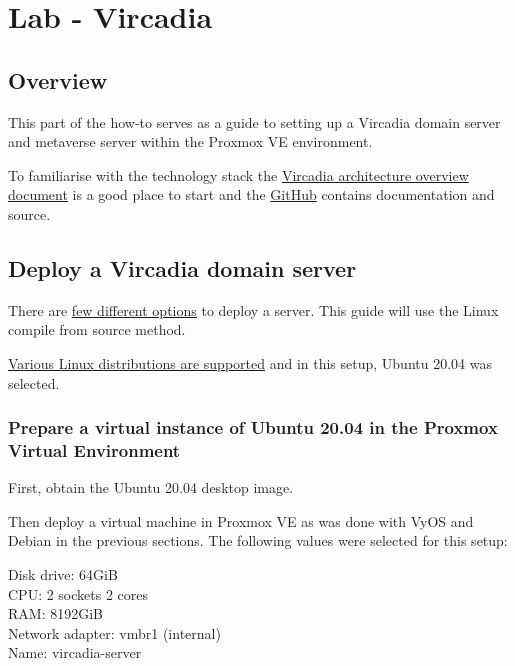 \hypertarget{lab---vircadia}{%
\section{Lab - Vircadia}\label{lab---vircadia}}

\hypertarget{overview}{%
\subsection{Overview}\label{overview}}

This part of the how-to serves as a guide to setting up a Vircadia
domain server and metaverse server within the Proxmox VE environment.

To familiarise with the technology stack the
\href{https://docs.vircadia.com/explore/get-started/architecture.html}{Vircadia
architecture overview document} is a good place to start and the
\href{https://github.com/vircadia/}{GitHub} contains documentation and
source.

\hypertarget{deploy-a-vircadia-domain-server}{%
\subsection{Deploy a Vircadia domain
server}\label{deploy-a-vircadia-domain-server}}

There are \href{https://vircadia.com/deploy-a-server/}{few different
options} to deploy a server. This guide will use the Linux compile from
source method.

\href{https://github.com/vircadia/vircadia-builder\#supported-platforms}{Various
Linux distributions are supported} and in this setup, Ubuntu 20.04 was
selected.

\hypertarget{prepare-a-virtual-instance-of-ubuntu-20.04-in-the-proxmox-virtual-environment}{%
\subsubsection{Prepare a virtual instance of Ubuntu 20.04 in the Proxmox
Virtual
Environment}\label{prepare-a-virtual-instance-of-ubuntu-20.04-in-the-proxmox-virtual-environment}}

First, obtain the Ubuntu 20.04 desktop image.

Then deploy a virtual machine in Proxmox VE as was done with VyOS and
Debian in the previous sections. The following values were selected for
this setup:

Disk drive: 64GiB\\
CPU: 2 sockets 2 cores\\
RAM: 8192GiB\\
Network adapter: vmbr1 (internal)\\
Name: vircadia-server

